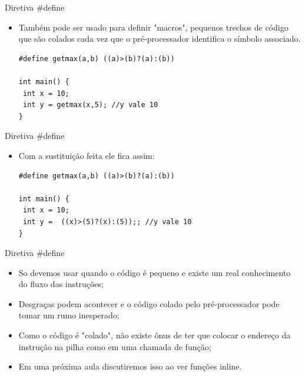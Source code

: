 \documentclass[12pt,table,xcolor={dvipsnames}]{beamer}
\begin{document}
\begin{frame}[fragile]{Diretiva \#define}
\begin{itemize}
\item Também pode ser usado para definir "macros", pequenos trechos de código que são colados cada vez que o pré-processador identifica o símbolo associado.
\begin{lstlisting}
#define getmax(a,b) ((a)>(b)?(a):(b))

int main() {
 int x = 10;
 int y = getmax(x,5); //y vale 10
}
\end{lstlisting}
\end{itemize}
\end{frame}

\begin{frame}[fragile]{Diretiva \#define}
\begin{itemize}
\item Com a sustituição feita ele fica assim:
\begin{lstlisting}
#define getmax(a,b) ((a)>(b)?(a):(b))

int main() {
 int x = 10;
 int y =  ((x)>(5)?(x):(5));; //y vale 10
}
\end{lstlisting}
\end{itemize}
\end{frame}

\begin{frame}[fragile]{Diretiva \#define}
\begin{itemize}
\item So devemos usar quando o código é pequeno e existe um real conhecimento do fluxo das instruções;
\item Desgraças podem acontecer e o código colado pelo pré-processador pode tomar um rumo inesperado;
\item Como o código é "colado", não existe ônus de ter que colocar o endereço da instrução na pilha como em uma chamada de função;
\item Em uma próxima aula discutiremos isso ao ver funções inline.
\end{itemize}
\end{frame}
\end{document}
